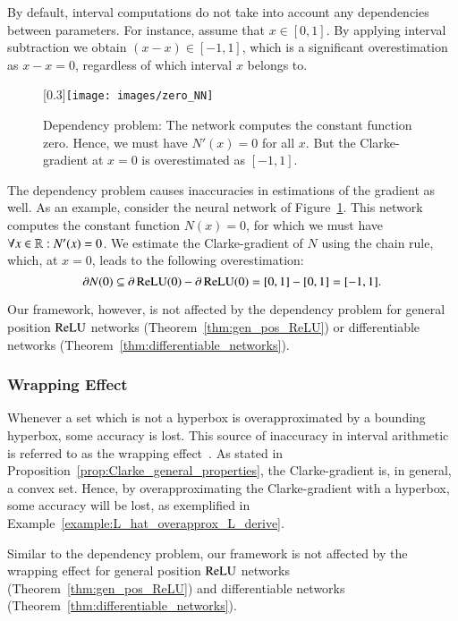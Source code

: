 \documentclass[11pt,times]{article}
\begin{document}
By default, interval computations do not take into account any
dependencies between parameters. For instance, assume that
$x \in [0,1]$. By applying interval subtraction we obtain
$ (x-x) \in [-1,1]$, which is a significant overestimation as $x-x=0$,
regardless of which interval $x$ belongs to.


\begin{figure}[t]
  \centering
   \scalebox{0.3}[0.3]{\texttt{[image: images/zero\_NN]}}
   \caption{Dependency problem: The network computes the constant
     function zero. Hence, we must have $N'(x)=0$ for all $x$. But the
     Clarke-gradient at $x=0$ is overestimated as $[-1,1]$.}
  \label{fig:dependency-zero_NN}
\end{figure}


The dependency problem causes inaccuracies in estimations of the
gradient as well. As an example, consider the neural network of
Figure~\ref{fig:dependency-zero_NN}. This network computes the
constant function $N(x)=0$, for which we must have
$\forall x \in \mathbb{R}: N'(x)=0$. We estimate the Clarke-gradient of $N$
using the chain rule, which, at $x = 0$, leads to the following
overestimation:
%
\begin{equation*}
\partial N(0) \subseteq \partial \operatorname{\mathrm{ReLU}}(0) - \partial \operatorname{\mathrm{ReLU}}(0) = [0,1] -
[0,1] =  [-1,1].
\end{equation*}
%

Our framework, however, is not affected by the dependency problem for
general position $\operatorname{\mathrm{ReLU}}$ networks (Theorem~\ref{thm:gen_pos_ReLU}) or
differentiable networks (Theorem~\ref{thm:differentiable_networks}).



\subsubsection{Wrapping Effect}
\label{subsubsec:wrapping_effect}

Whenever a set which is not a hyperbox is overapproximated by a
bounding hyperbox, some accuracy is lost. This source of
inaccuracy in interval arithmetic is referred to as the wrapping
effect~\parencite{Neumaier:Wrapping_Effect:1993}. As stated in
Proposition~\ref{prop:Clarke_general_properties}, the Clarke-gradient
is, in general, a convex set. Hence, by overapproximating the
Clarke-gradient with a hyperbox, some accuracy will be lost, as
exemplified in Example~\ref{example:L_hat_overapprox_L_derive}.

Similar to the dependency problem, our framework is not affected by
the wrapping effect for general position $\operatorname{\mathrm{ReLU}}$ networks
(Theorem~\ref{thm:gen_pos_ReLU}) and differentiable networks
(Theorem~\ref{thm:differentiable_networks}).
\end{document}

